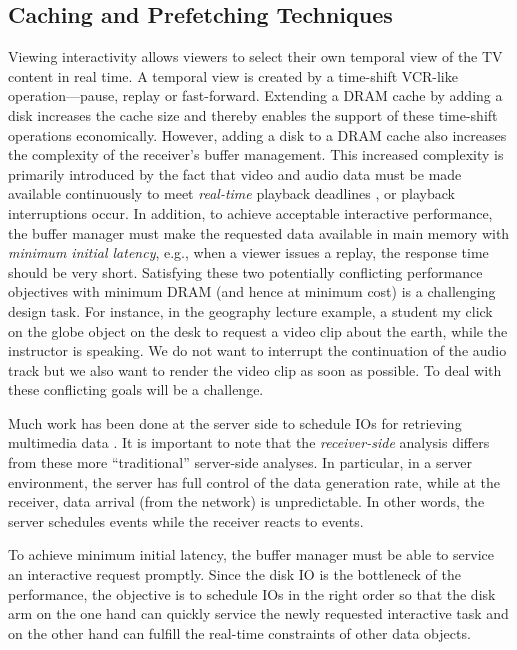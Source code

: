 \subsection{Caching and Prefetching Techniques}

Viewing interactivity allows viewers to select their own
temporal view of the TV content in real time.
A temporal view is created by a time-shift VCR-like 
operation---pause, replay or fast-forward. Extending a DRAM cache
by adding a disk increases the cache size and thereby
enables the support of these time-shift operations economically.
However, adding a disk to a DRAM cache also increases the complexity of
the receiver's buffer management.
This increased complexity is primarily introduced by the fact that
video and audio data must be made available continuously
to meet {\em real-time} playback deadlines \cite{ex9}, or playback 
interruptions occur. In addition, to achieve acceptable 
interactive performance,
the buffer manager must make the requested data available
in main memory with {\em minimum initial latency}, e.g.,
when a viewer issues a replay, the response time should be very short.
Satisfying these two potentially conflicting performance 
objectives with minimum DRAM (and hence at minimum cost) 
is a challenging design task.
For instance, in the geography lecture example, a
student my click on the globe object on the desk to request a
video clip about the earth, while the instructor
is speaking. We do not want to interrupt the
continuation of the audio track but we also want
to render the video clip as soon as possible.
To deal with these conflicting goals will be a challenge.

Much work has been done at the server side to schedule IOs
for retrieving
multimedia data \cite{ex121,ex86,ex8-1,ex18,ex302,ex10}.
It is important to note that the {\em receiver-side}
analysis differs from these more
``traditional'' server-side analyses.
In particular, in a server environment, the server has full control of
the data generation rate, while at the receiver, data arrival (from
the network) is unpredictable.
In other words, the server schedules events while the receiver
reacts to events.

To achieve minimum initial latency,
the buffer manager
must be able to service an interactive request
promptly. Since the disk IO is the bottleneck of
the performance, the objective is to schedule IOs
in the right order so that the disk arm on the one hand can
quickly service the newly requested
interactive task and on the other hand can fulfill
the real-time constraints of other data objects.
                                         

